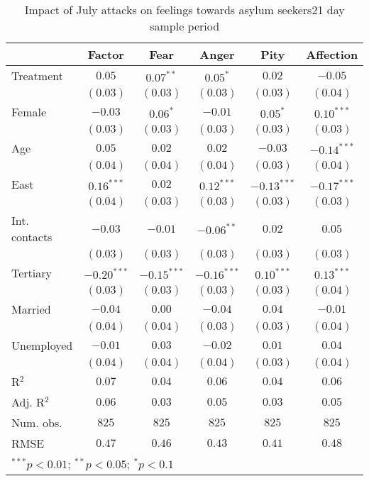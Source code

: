 
\begin{table}
\caption{Impact of July attacks on feelings towards asylum seekers21 day sample period}
\begin{center}
\begin{tabular}{l c c c c c}
\toprule
 & Factor & Fear & Anger & Pity & Affection \\
\midrule
Treatment     & $0.05$        & $0.07^{**}$   & $0.05^{*}$    & $0.02$        & $-0.05$       \\
              & $(0.03)$      & $(0.03)$      & $(0.03)$      & $(0.03)$      & $(0.04)$      \\
Female        & $-0.03$       & $0.06^{*}$    & $-0.01$       & $0.05^{*}$    & $0.10^{***}$  \\
              & $(0.03)$      & $(0.03)$      & $(0.03)$      & $(0.03)$      & $(0.03)$      \\
Age           & $0.05$        & $0.02$        & $0.02$        & $-0.03$       & $-0.14^{***}$ \\
              & $(0.04)$      & $(0.04)$      & $(0.04)$      & $(0.03)$      & $(0.04)$      \\
East          & $0.16^{***}$  & $0.02$        & $0.12^{***}$  & $-0.13^{***}$ & $-0.17^{***}$ \\
              & $(0.04)$      & $(0.03)$      & $(0.03)$      & $(0.03)$      & $(0.03)$      \\
Int. contacts & $-0.03$       & $-0.01$       & $-0.06^{**}$  & $0.02$        & $0.05$        \\
              & $(0.03)$      & $(0.03)$      & $(0.03)$      & $(0.03)$      & $(0.03)$      \\
Tertiary      & $-0.20^{***}$ & $-0.15^{***}$ & $-0.16^{***}$ & $0.10^{***}$  & $0.13^{***}$  \\
              & $(0.03)$      & $(0.03)$      & $(0.03)$      & $(0.03)$      & $(0.04)$      \\
Married       & $-0.04$       & $0.00$        & $-0.04$       & $0.04$        & $-0.01$       \\
              & $(0.04)$      & $(0.04)$      & $(0.03)$      & $(0.03)$      & $(0.04)$      \\
Unemployed    & $-0.01$       & $0.03$        & $-0.02$       & $0.01$        & $0.04$        \\
              & $(0.04)$      & $(0.04)$      & $(0.04)$      & $(0.03)$      & $(0.04)$      \\
\midrule
R$^2$         & $0.07$        & $0.04$        & $0.06$        & $0.04$        & $0.06$        \\
Adj. R$^2$    & $0.06$        & $0.03$        & $0.05$        & $0.03$        & $0.05$        \\
Num. obs.     & $825$         & $825$         & $825$         & $825$         & $825$         \\
RMSE          & $0.47$        & $0.46$        & $0.43$        & $0.41$        & $0.48$        \\
\bottomrule
\multicolumn{6}{l}{\scriptsize{$^{***}p<0.01$; $^{**}p<0.05$; $^{*}p<0.1$}}
\end{tabular}
\label{tab_emo_21}
\end{center}
\end{table}
